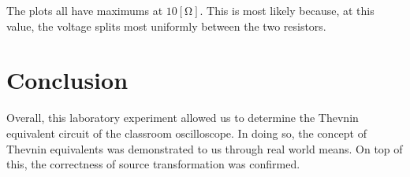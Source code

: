 \documentclass[
	letterpaper, %
	10pt, %
]{CSUniSchoolLabReport}
\begin{document}
    The plots all have maximums at $10[\si{\ohm}]$. This is most likely because, at this value, the voltage splits most uniformly between the two resistors.

\section{Conclusion}

Overall, this laboratory experiment allowed us to determine the Thevnin equivalent circuit of the classroom oscilloscope. In doing so, the concept of Thevnin equivalents was demonstrated to us through real world means. On top of this, the correctness of source transformation was confirmed.
\end{document}
